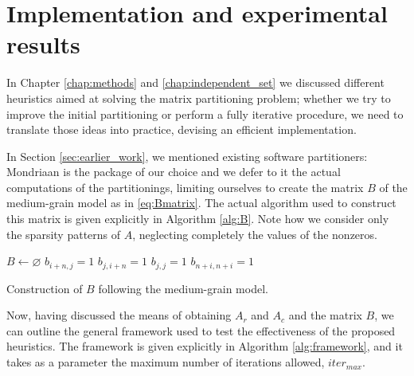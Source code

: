 \chapter{Implementation and experimental results} \label{chap:experimental_results}

In Chapter \ref{chap:methods} and \ref{chap:independent_set} we discussed different heuristics aimed at solving the matrix partitioning problem; whether we try to improve the initial partitioning or perform a fully iterative procedure, we need to translate those ideas into practice, devising an efficient implementation.

In Section \ref{sec:earlier_work}, we mentioned existing software partitioners: Mondriaan \cite{mondriaan} is the package of our choice and we defer to it the actual computations of the partitionings, limiting ourselves to create the matrix $B$ of the medium-grain model as in \eqref{eq:Bmatrix}. The actual algorithm used to construct this matrix is given explicitly in Algorithm \ref{alg:B}. Note how we consider only the sparsity patterns of $A$, neglecting completely the values of the nonzeros.

\begin{algorithm}[h]
	\begin{algorithmic}
		\State $B \gets \varnothing$
		 
		\State $b_{i+n,j} = 1$
		\EndFor
		 
		\State $b_{j,i+n} = 1$
		\EndFor
		 
		\State $b_{j,j} = 1$
		\EndIf
		\EndFor
		 
		\State $b_{n+i,n+i} = 1$
		\EndIf
		\EndFor
	\end{algorithmic}
	\caption{Construction of $B$ following the medium-grain model.} \label{alg:B}
\end{algorithm}

Now, having discussed the means of obtaining $A_r$ and $A_c$ and the matrix $B$, we can outline the general framework used to test the effectiveness of the proposed heuristics. The framework is given explicitly in Algorithm \ref{alg:framework}, and it takes as a parameter the maximum number of iterations allowed, $iter_{max}$.  

